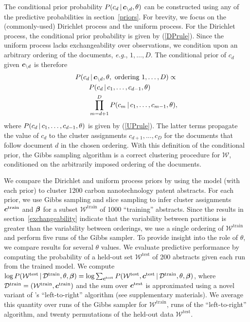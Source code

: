 \documentclass[twoside]{article}
\begin{document}
The conditional prior probability $P(c_d \,|\, \boldsymbol{c}_{\setminus d},
\theta)$ can be constructed using any of the predictive probabilities
in section~\ref{priors}. For brevity, we focus on the (commonly-used)
Dirichlet process and the uniform process. For the Dirichlet process,
the conditional prior probability is given by (\ref{DPrule}). Since
the uniform process lacks exchangeability over observations, we
condition upon an arbitrary ordering of the documents, \emph{e.g.},
$1, \dots, D$. The conditional prior of $c_d$ given $\boldsymbol{c}_{\setminus
  d}$ is therefore
\begin{align}
&P(c_d \,|\, \boldsymbol{c}_{\setminus d}, \theta, \textrm{ ordering $1, \ldots, D$})
\propto \notag\\
&\qquad P(c_d \,|\, c_1,\ldots,c_{d-1}, \theta) \notag \\
&\qquad \prod_{m=d+1}^{D} P(c_m
\,|\, c_1,\ldots,c_{m-1}, \theta),
\end{align}
where $P(c_d \,|\, c_1,\ldots,c_{d-1}, \theta)$ is given by
(\ref{UPrule}).  The latter terms propagate the value of $c_d$ to the
cluster assignments $c_{d+1}, \ldots, c_D$ for the documents that
follow document $d$ in the chosen ordering. With this definition of
the conditional prior, the Gibbs sampling algorithm is a correct
clustering procedure for $\mathcal{W}$, conditioned on the arbitrarily
imposed ordering of the documents.

We compare the Dirichlet and uniform process priors by using the model
(with each prior) to cluster 1200 carbon nanotechnology patent
abstracts. For each prior, we use Gibbs sampling and slice sampling to
infer cluster assignments $\boldsymbol{c}^{\textrm{train}}$ and $\boldsymbol{\beta}$ for a
subset $\mathcal{W}^{\textrm{train}}$ of 1000 ``training''
abstracts. Since the results in section~\ref{exchangeability} indicate
that the variability between partitions is greater than the
variability between orderings, we use a single ordering of
$\mathcal{W}^{\textrm{train}}$ and perform five runs of the Gibbs
sampler. To provide insight into the role of $\theta$, we compare
results for several $\theta$ values. We evaluate predictive
performance by computing the probability of a held-out set
$\mathcal{W}^{\textrm{test}}$ of 200 abstracts given each run from the
trained model. We compute $\log{P(\mathcal{W}^{\textrm{test}} \,|\,\mathcal{D}^{\textrm{train}}, \theta, \boldsymbol{\beta})} =
\log{\sum_{\boldsymbol{c}^{\textrm{test}}} P(\mathcal{W}^{\textrm{test}},
  \boldsymbol{c}^{\textrm{test}} \,|\,\mathcal{D}^{\textrm{train}}, \theta,
  \boldsymbol{\beta})}$, where $\mathcal{D}^{\textrm{train}} =
(\mathcal{W}^{\textrm{train}}, \boldsymbol{c}^{\textrm{train}})$ and the sum over
$\boldsymbol{c}^{\textrm{test}}$ is approximated using a novel variant of
\cite[]{wallach09evaluation}'s ``left-to-right'' algorithm (see
supplementary materials). We average this quantity over runs of the
Gibbs sampler for $\mathcal{W}^{\textrm{train}}$, runs of the
``left-to-right'' algorithm, and twenty permutations of the held-out
data $\mathcal{W}^{\textrm{test}}$.
\end{document}
